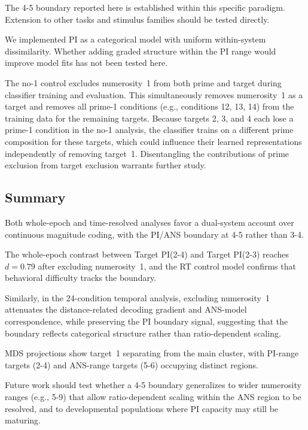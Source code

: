 The 4-5 boundary reported here is established within this specific
paradigm. Extension to other tasks and stimulus families should be
tested directly.

We implemented PI as a categorical model with uniform within-system
dissimilarity. Whether adding graded structure within the PI range
would improve model fits has not been tested here.

The no-1 control excludes numerosity~1 from both prime and target
during classifier training and evaluation. This simultaneously removes
numerosity~1 as a target and removes all prime-1 conditions (e.g.,
conditions 12, 13, 14) from the training data for the remaining
targets. Because targets 2, 3, and 4 each lose a prime-1 condition in
the no-1 analysis, the classifier trains on a different prime
composition for these targets, which could influence their learned
representations independently of removing target~1. Disentangling the
contributions of prime exclusion from target exclusion warrants further
study.

\subsection{Summary}
Both whole-epoch and time-resolved analyses favor a dual-system account
over continuous magnitude coding, with the PI/ANS boundary at 4-5
rather than 3-4.

The whole-epoch contrast between Target PI(2-4) and Target PI(2-3) reaches $d = 0.79$
after excluding numerosity~1, and the RT control model confirms that
behavioral difficulty tracks the boundary.

Similarly, in the 24-condition temporal analysis, excluding numerosity~1 attenuates
the distance-related decoding gradient and ANS-model correspondence, while
preserving the PI boundary signal, suggesting that the boundary reflects
categorical structure rather than ratio-dependent scaling.

MDS projections show target~1 separating from the main cluster, with
PI-range targets (2-4) and ANS-range targets (5-6) occupying distinct
regions.

Future work
should test whether a 4-5 boundary generalizes to wider numerosity ranges
(e.g., 5-9) that allow ratio-dependent scaling within the ANS region to
be resolved, and to developmental populations where PI capacity may
still be maturing.
